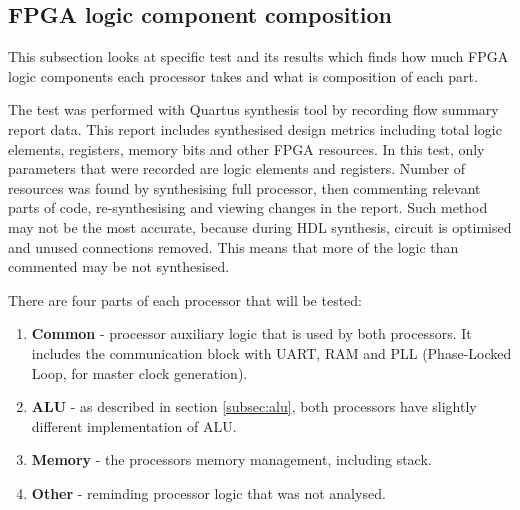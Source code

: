 \subsection{FPGA logic component composition}
This subsection looks at specific test and its results which finds how much FPGA logic components each processor takes and what is composition of each part.

The test was performed with Quartus synthesis tool by recording flow summary report data. This report includes synthesised design metrics including total logic elements, registers, memory bits and other FPGA resources. In this test, only parameters that were recorded are logic elements and registers. Number of resources was found by synthesising full processor, then commenting relevant parts of code, re-synthesising and viewing changes in the report. Such method may not be the most accurate, because during HDL synthesis, circuit is optimised and unused connections removed. This means that more of the logic than commented may be not synthesised. 

There are four parts of each processor that will be tested: 
\begin{enumerate}
	\item \textbf{Common} - processor auxiliary logic that is used by both processors. It includes the communication block with UART, RAM and PLL (Phase-Locked Loop, for master clock generation). 
	\item \textbf{ALU} - as described in section \ref{subsec:alu}, both processors have slightly different implementation of ALU.
	\item \textbf{Memory} - the processors memory management, including stack.
	\item \textbf{Other} - reminding processor logic that was not analysed.
\end{enumerate}

